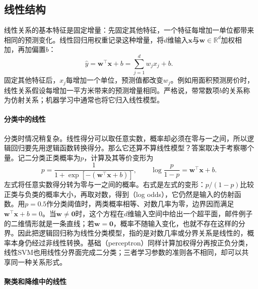 \subsection{线性结构}
\label{sec:models-linear}

线性关系的基本特征是固定增量：先固定其他特征，一个特征每增加一单位都带来相同的预测变化。线性回归用权重记录这种增量，将$d$维输入$\bm{x}$与$\bm{w}\in\mathbb{R}^{d}$加权相加，再加偏置$b$：
\begin{equation}
  \hat{y}=\bm{w}^{\top}\bm{x}+b
  =\sum_{j=1}^{d}w_jx_j+b.
  \label{eq:models-linear-score}
\end{equation}
固定其他特征后，$x_j$每增加一个单位，预测值都改变$w_j$。例如用面积预测房价时，线性关系假设每增加一平方米带来的预测增量相同。严格说，带常数项$b$的关系称为仿射关系；机器学习中通常也将它归入线性模型。

\paragraph{分类中的线性}

分类时情况稍复杂。线性得分可以取任意实数，概率却必须在零与一之间，所以逻辑回归要先用逻辑函数转换得分。那么它还算不算线性模型？答案取决于考察哪个量。记二分类正类概率为$p$，计算及其等价变形为
\begin{equation}
  p=\frac{1}{1+\exp[-(\bm{w}^{\top}\bm{x}+b)]},
  \qquad
  \log\frac{p}{1-p}=\bm{w}^{\top}\bm{x}+b.
  \label{eq:models-logistic-structure}
\end{equation}
左式将任意实数得分转为零与一之间的概率。右式是左式的变形：$p/(1-p)$比较正类与负类的概率大小，再取对数，得到（log odds），它仍然是输入的仿射函数。用$p=0.5$作分类阈值时，两类概率相等、对数几率为零，边界因而满足$\bm{w}^{\top}\bm{x}+b=0$。当$\bm{w}\ne\bm{0}$时，这个方程在$d$维输入空间中给出一个超平面，邮件例子的二维情形就是一条直线；若$\bm{w}=\bm{0}$，概率不随输入变化，也就不存在这样的分界。因此把逻辑回归称为线性分类模型，指的是对数几率或分界关系是线性的，概率本身仍经过非线性转换。基础（perceptron）同样计算加权得分再按正负分类，线性SVM也用线性分界面完成二分类；三者学习参数的准则各不相同，却可以共享同一种关系形式。

\paragraph{聚类和降维中的线性}

